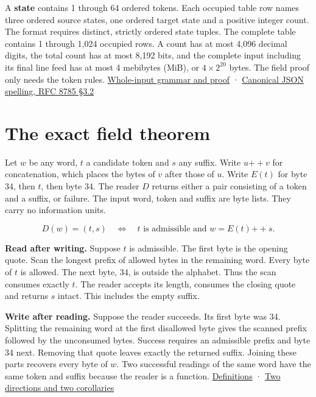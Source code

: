 A \textbf{state} contains 1 through 64 ordered tokens. Each occupied table row names three ordered source states, one ordered target state and a positive integer count. The format requires distinct, strictly ordered state tuples. The complete table contains 1 through 1,024 occupied rows. A count has at most 4,096 decimal digits, the total count has at most 8,192 bits, and the complete input including its final line feed has at most 4 mebibytes (MiB), or \(4\times2^{20}\) bytes. The field proof only needs the token rules. \href{https://github.com/sepahead/pid-rs/blob/main/audit/research/categorical-count-table-encoding/README.md}{Whole-input grammar and proof} · \href{https://datatracker.ietf.org/doc/html/rfc8785\#section-3.2}{Canonical JSON spelling, RFC 8785 §3.2}

\clearpage

\section{The exact field theorem}\label{the-exact-field-theorem}

Let \(w\) be any word, \(t\) a candidate token and \(s\) any suffix. Write \(u\mathbin{+\!+}v\) for concatenation, which places the bytes of \(v\) after those of \(u\). Write \(E(t)\) for byte 34, then \(t\), then byte 34. The reader \(D\) returns either a pair consisting of a token and a suffix, or failure. The input word, token and suffix are byte lists. They carry no information units.

\[
D(w)=(t,s)\quad\Longleftrightarrow\quad
t\text{ is admissible and }w=E(t)\mathbin{+\!+}s.
\]

\textbf{Read after writing.} Suppose \(t\) is admissible. The first byte is the opening quote. Scan the longest prefix of allowed bytes in the remaining word. Every byte of \(t\) is allowed. The next byte, 34, is outside the alphabet. Thus the scan consumes exactly \(t\). The reader accepts its length, consumes the closing quote and returns \(s\) intact. This includes the empty suffix.

\textbf{Write after reading.} Suppose the reader succeeds. Its first byte was 34. Splitting the remaining word at the first disallowed byte gives the scanned prefix followed by the unconsumed bytes. Success requires an admissible prefix and byte 34 next. Removing that quote leaves exactly the returned suffix. Joining these parts recovers every byte of \(w\). Two successful readings of the same word have the same token and suffix because the reader is a function. \href{https://github.com/sepahead/pid-rs/blob/main/audit/research/categorical-state-token/lean/Model.lean}{Definitions} · \href{https://github.com/sepahead/pid-rs/blob/main/audit/research/categorical-state-token/lean/Proof.lean}{Two directions and two corollaries}

